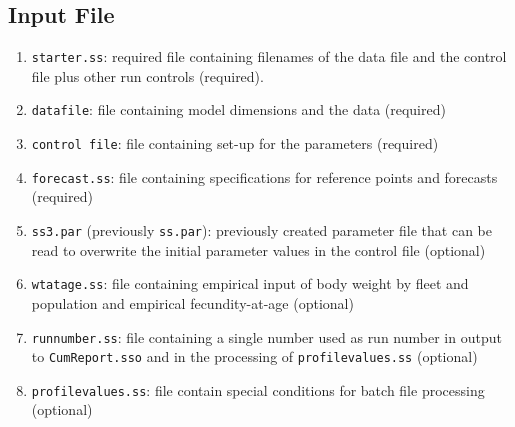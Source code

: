 \subsection{Input File}
\begin{enumerate}
	\item \verb|starter.ss|: required file containing filenames of the data file and the control file plus other run controls (required).
	\item \verb|datafile|: file containing model dimensions and the data (required)
	\item \verb|control file|: file containing set-up for the parameters (required)
	\item \verb|forecast.ss|: file containing specifications for reference points and forecasts (required) 
	\item \verb|ss3.par| (previously \verb|ss.par|): previously created parameter file that can be read to overwrite the initial parameter values in the control file (optional)
	\item \verb|wtatage.ss|: file containing empirical input of body weight by fleet and population and empirical fecundity-at-age (optional)
	\item \verb|runnumber.ss|: file containing a single number used as run number in output to \verb|CumReport.sso| and in the processing of \verb|profilevalues.ss| (optional)
	\item \verb|profilevalues.ss|: file contain special conditions for batch file processing (optional)
\end{enumerate}
	
\hypertarget{OutputFilesList}{}
